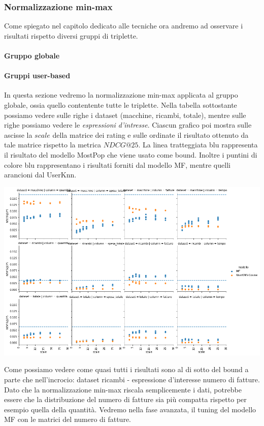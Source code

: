 \subsubsection{Normalizzazione min-max}
Come spiegato nel capitolo dedicato alle tecniche ora andremo ad osservare i risultati rispetto diversi gruppi di triplette.

\paragraph{Gruppo globale}



\paragraph{Gruppi user-based}
In questa sezione vedremo la normalizzazione min-max applicata al gruppo globale, ossia quello contentente tutte le triplette.
Nella tabella sottostante possiamo vedere sulle righe i dataset (macchine, ricambi, totale), mentre sulle righe possiamo vedere le \textit{espressioni d'intresse}. Ciascun grafico poi mostra sulle ascisse la $scale$ della matrice dei rating e sulle ordinate il risultato ottenuto da tale matrice rispetto la metrica $NDCG@25$. La linea tratteggiata blu rappresenta il risultato del modello MostPop che viene usato come bound.
Inoltre i puntini di colore blu rappresentano i risultati forniti dal modello MF, mentre quelli arancioni dal UserKnn.

\includegraphics[width=16cm]{figures/risultati_minmax_singolo.png}

Come possiamo vedere come quasi tutti i risultati sono al di sotto del bound a parte che nell'incrocio: dataset ricambi - espressione d'interesse numero di fatture. Dato che la normalizzazione min-max riscala semplicemente i dati, potrebbe essere che la distribuzione del numero di fatture sia più compatta rispetto per esempio quella della quantità. Vedremo nella fase avanzata, il tuning del modello MF con le matrici del numero di fatture.

